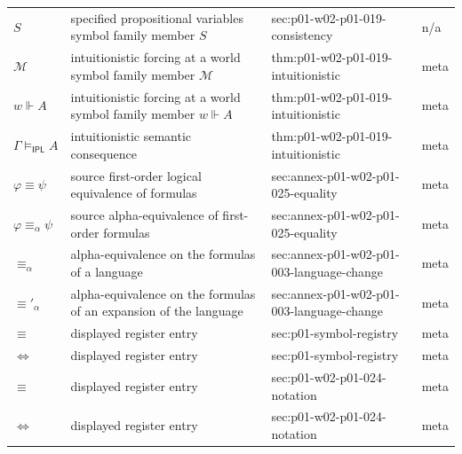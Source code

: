 \begin{longtable}{@{}p{}p{}p{}p{}@{}}
\(S\) & specified propositional variables symbol family member \(S\) & sec:\allowbreak{}p01-\allowbreak{}w02-\allowbreak{}p01-\allowbreak{}019-\allowbreak{}consistency & n/a \\
\(\mathcal M\) & intuitionistic forcing at a world symbol family member \(\mathcal M\) & thm:\allowbreak{}p01-\allowbreak{}w02-\allowbreak{}p01-\allowbreak{}019-\allowbreak{}intuitionistic & meta \\
\(w\Vdash A\) & intuitionistic forcing at a world symbol family member \(w\Vdash A\) & thm:\allowbreak{}p01-\allowbreak{}w02-\allowbreak{}p01-\allowbreak{}019-\allowbreak{}intuitionistic & meta \\
\(\Gamma\models_{\mathsf{IPL}}A\) & intuitionistic semantic consequence & thm:\allowbreak{}p01-\allowbreak{}w02-\allowbreak{}p01-\allowbreak{}019-\allowbreak{}intuitionistic & meta \\
\(\varphi\equiv\psi\) & source first-order logical equivalence of formulas & sec:\allowbreak{}annex-\allowbreak{}p01-\allowbreak{}w02-\allowbreak{}p01-\allowbreak{}025-\allowbreak{}equality & meta \\
\(\varphi\equiv_\alpha\psi\) & source alpha-equivalence of first-order formulas & sec:\allowbreak{}annex-\allowbreak{}p01-\allowbreak{}w02-\allowbreak{}p01-\allowbreak{}025-\allowbreak{}equality & meta \\
\(\equiv_\alpha\) & alpha-equivalence on the formulas of a language & sec:\allowbreak{}annex-\allowbreak{}p01-\allowbreak{}w02-\allowbreak{}p01-\allowbreak{}003-\allowbreak{}language-\allowbreak{}change & meta \\
\(\equiv'_\alpha\) & alpha-equivalence on the formulas of an expansion of the language & sec:\allowbreak{}annex-\allowbreak{}p01-\allowbreak{}w02-\allowbreak{}p01-\allowbreak{}003-\allowbreak{}language-\allowbreak{}change & meta \\
\(\equiv\) & displayed register entry & sec:\allowbreak{}p01-\allowbreak{}symbol-\allowbreak{}registry & meta \\
\(\Leftrightarrow\) & displayed register entry & sec:\allowbreak{}p01-\allowbreak{}symbol-\allowbreak{}registry & meta \\
\(\equiv\) & displayed register entry & sec:\allowbreak{}p01-\allowbreak{}w02-\allowbreak{}p01-\allowbreak{}024-\allowbreak{}notation & meta \\
\(\Leftrightarrow\) & displayed register entry & sec:\allowbreak{}p01-\allowbreak{}w02-\allowbreak{}p01-\allowbreak{}024-\allowbreak{}notation & meta \\

\end{longtable}
